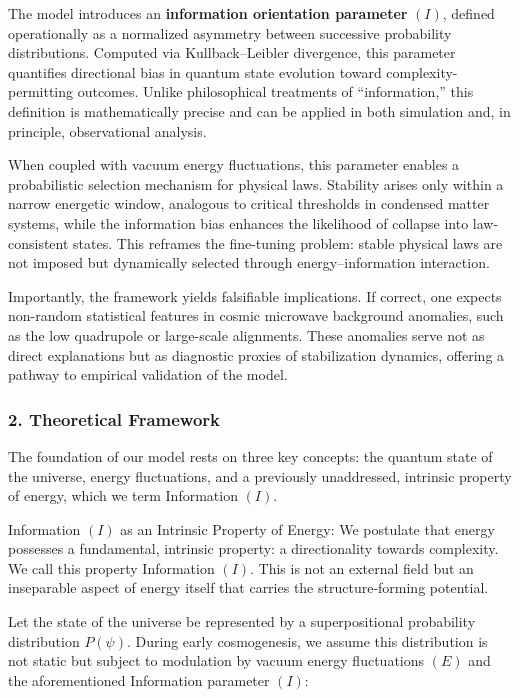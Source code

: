 The model introduces an \textbf{information orientation parameter}
\((I)\), defined operationally as a normalized asymmetry between
successive probability distributions. Computed via Kullback--Leibler
divergence, this parameter quantifies directional bias in quantum state
evolution toward complexity-permitting outcomes. Unlike philosophical
treatments of ``information,'' this definition is mathematically precise
and can be applied in both simulation and, in principle, observational
analysis.

When coupled with vacuum energy fluctuations, this parameter enables a
probabilistic selection mechanism for physical laws. Stability arises
only within a narrow energetic window, analogous to critical thresholds
in condensed matter systems, while the information bias enhances the
likelihood of collapse into law-consistent states. This reframes the
fine-tuning problem: stable physical laws are not imposed but
dynamically selected through energy--information interaction.

Importantly, the framework yields falsifiable implications. If correct,
one expects non-random statistical features in cosmic microwave
background anomalies, such as the low quadrupole or large-scale
alignments. These anomalies serve not as direct explanations but as
diagnostic proxies of stabilization dynamics, offering a pathway to
empirical validation of the model.

\subsubsection{\texorpdfstring{\textbf{2. Theoretical
Framework}}{2. Theoretical Framework}}\label{theoretical-framework}

The foundation of our model rests on three key concepts: the quantum
state of the universe, energy fluctuations, and a previously
unaddressed, intrinsic property of energy, which we term Information
\((I)\).

Information \((I)\) as an Intrinsic Property of Energy: We postulate
that energy possesses a fundamental, intrinsic property: a
directionality towards complexity. We call this property Information
\((I)\). This is not an external field but an inseparable aspect of
energy itself that carries the structure-forming potential.

Let the state of the universe be represented by a superpositional
probability distribution \(P(ψ)\). During early cosmogenesis, we assume
this distribution is not static but subject to modulation by vacuum
energy fluctuations \((E)\) and the aforementioned Information parameter
\((I)\):

